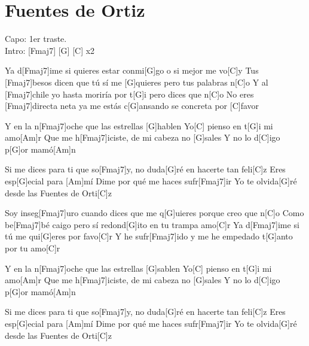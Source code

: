 \section{Fuentes de Ortiz}

\noindent
\chordFmajs
\chordG
\chordC 

\vspace{1cm}

\begin{guitar}

	\begin{multicols}{2}
	
		Capo: 1er traste. \\
	
		Intro: \hspace{0.5cm} [Fmaj7] \hspace{0.5cm}[G] \hspace{0.5cm} [C] \hspace{0.3cm} x2
		
		\newline
	
		Ya d[Fmaj7]ime si quieres estar 
		conmi[G]go o si mejor me vo[C]y
		Tus [Fmaj7]besos dicen que tú sí 
		me [G]quieres pero tus palabras n[C]o
		Y al [Fmaj7]chile yo hasta moriría 
		por t[G]i pero dices que n[C]o
		No eres [Fmaj7]directa neta ya me 
		estás c[G]ansando se concreta por [C]favor
		
		\newline
		Y en la n[Fmaj7]oche que las estrellas [G]hablen 
		Yo[C] pienso en t[G]i mi amo[Am]r
		Que me h[Fmaj7]iciste, de mi cabeza no [G]sales
		Y no lo d[C]igo p[G]or mamó[Am]n
		
		Si me dices para ti que so[Fmaj7]y, no duda[G]ré en hacerte tan feli[C]z
		Eres esp[G]ecial para [Am]mí
		Dime por qué me haces sufr[Fmaj7]ir
		Yo te olvida[G]ré desde las Fuentes de Orti[C]z
		
		\newline
		Soy inseg[Fmaj7]uro cuando dices que 
		me q[G]uieres porque creo que n[C]o
		Como be[Fmaj7]bé caigo pero sí 
		redond[G]ito en tu trampa amo[C]r
		Ya d[Fmaj7]ime si tú 
		me qui[G]eres por favo[C]r
		Y he sufr[Fmaj7]ido y me he 
		empedado t[G]anto por tu amo[C]r
		
		\newline
		Y en la n[Fmaj7]oche que las estrellas [G]sablen 
		Yo[C] pienso en t[G]i mi amo[Am]r
		Que me h[Fmaj7]iciste, de mi cabeza no [G]sales
		Y no lo d[C]igo p[G]or mamó[Am]n
		
		Si me dices para ti que so[Fmaj7]y, no duda[G]ré en hacerte tan feli[C]z
		Eres esp[G]ecial para [Am]mí
		Dime por qué me haces sufr[Fmaj7]ir
		Yo te olvida[G]ré desde las Fuentes de Orti[C]z
		

\end{multicols}
\end{guitar}
